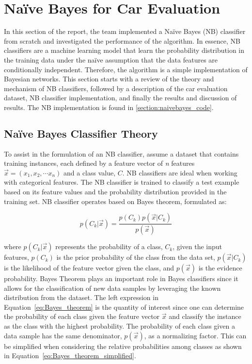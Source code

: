 \documentclass[a4paper]{article}
\begin{document}
\section{Naïve Bayes for Car Evaluation}\label{Naïve}
In this section of the report, the team implemented a Naïve Bayes (NB) classifier from scratch and investigated the performance of the algorithm. In essence, NB classifiers are a machine learning model that learn the probability distribution in the training data under the naïve assumption that the data features are conditionally independent. Therefore, the algorithm is a simple implementation of Bayesian networks. This section starts with a review of the theory and mechanism of NB classifiers, followed by a description of the car evaluation dataset, NB classifier implementation, and finally the results and discussion of results. The NB implementation is found in \ref{section:naivebayes_code}.

\subsection{Naïve Bayes Classifier Theory}

To assist in the formulation of an NB classifier, assume a dataset that contains training instances, each defined by a feature vector of \textit{n} features $\vec{x}=(x_1, x_2, \cdots x_n)$ and a class value, $C$. NB classifiers are ideal when working with categorical features. The NB classifier is trained to classify a test example based on its feature values and the probability distribution provided in the training set. NB classifier operates based on Bayes theorem, formulated as:

\begin{equation} \label{eq:Bayes_theorem}
    p(C_k|\vec{x}) = \frac{p(C_k)p(\vec{x}|C_k)}{p(\vec{x})}
\end{equation}

where $p(C_k|\vec x)$ represents the probability of a class, $C_k$, given the input features, $p(C_k)$ is the prior probability of the class from the data set, $p(\vec x|C_k)$ is the likelihood of the feature vector given the class, and $p(\vec x)$ is the evidence probability. Bayes Theorem plays an important role in Bayes classifiers since it allows for the classification of new data samples by leveraging the known distribution from the dataset. The left expression in Equation~\ref{eq:Bayes_theorem} is the quantity of interest since one can determine the probability of each class given the feature vector $\vec {x}$ and classify the instance as the class with the highest probability. The probability of each class given a data sample has the same denominator, $p(\vec x)$, as a normalizing factor. This can be simplified when considering the relative probabilities among classes as shown in Equation~\ref{eq:Bayes_theorem_simplified}.
\end{document}
